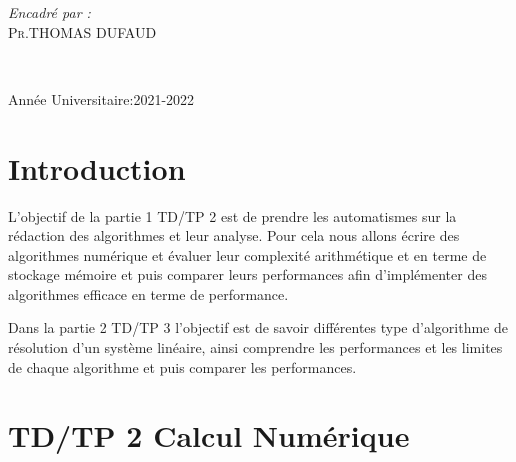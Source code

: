 \documentclass[12pt]{report}
\begin{document}
\begin{titlepage}
\begin{sffamily}
\begin{center}
\begin{minipage}{0.4\textwidth}
\begin{flushleft}
       
      \end{flushleft}
     \end{minipage}
     \begin{minipage}{0.4\textwidth}
      \begin{flushright} \large
       \textit{\Large Encadré par :}\\
       \textsc{\normalsize Pr.THOMAS DUFAUD}\\
       
      \end{flushright}
     \end{minipage}\\[1cm]
     
   
     
     \vfill
     

     {\large Année Universitaire:2021-2022}
     
    \end{center}
   \end{sffamily}
  \end{titlepage}
  

\pagebreak
\normalsize
\renewcommand{\footrulewidth}{1pt}


\chapter{Introduction}
L'objectif de la partie 1 TD/TP 2 est de prendre les automatismes sur la rédaction des algorithmes et leur analyse. Pour cela nous allons écrire des algorithmes numérique et évaluer leur complexité arithmétique et en terme de stockage mémoire et puis comparer leurs performances afin d'implémenter des algorithmes efficace en terme de performance.

Dans la partie 2 TD/TP 3 l'objectif est de savoir différentes type d'algorithme de résolution d'un système linéaire, ainsi comprendre les performances et les limites de chaque algorithme et puis comparer les performances.
\chapter{TD/TP 2 Calcul Numérique}
\end{document}
